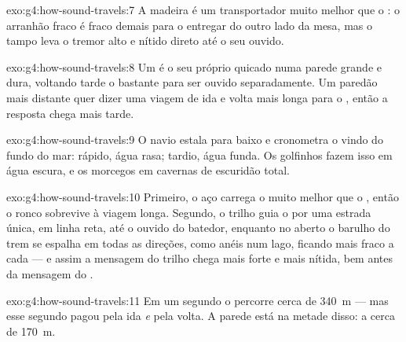 \begin{solution}{exo:g4:how-sound-travels:7}
A madeira é um transportador muito melhor que o : o arranhão fraco
é fraco demais para o  entregar do outro lado da mesa, mas o tampo
 leva o tremor alto e nítido direto até o seu ouvido.
\end{solution}

\begin{solution}{exo:g4:how-sound-travels:8}
Um  é o seu próprio  quicado numa parede grande e dura,
voltando tarde o bastante para ser ouvido separadamente. Um paredão
mais distante quer dizer uma viagem de ida e volta mais longa para o
, então a resposta chega mais tarde.
\end{solution}

\begin{solution}{exo:g4:how-sound-travels:9}
O navio estala para baixo e cronometra o  vindo do fundo do mar:
 rápido, água rasa;  tardio, água funda. Os golfinhos fazem
isso em água escura, e os morcegos em cavernas de escuridão total.
\end{solution}

\begin{solution}{exo:g4:how-sound-travels:10}
Primeiro, o aço carrega o  muito melhor que o , então o ronco
sobrevive à viagem longa. Segundo, o trilho guia o  por uma
estrada única, em linha reta, até o ouvido do batedor, enquanto no 
aberto o barulho do trem se espalha em todas as direções, como anéis
num lago, ficando mais fraco a cada  --- e assim a mensagem do
trilho chega mais forte e mais nítida, bem antes da mensagem do .
\end{solution}

\begin{solution}{exo:g4:how-sound-travels:11}
Em um segundo o  percorre cerca de \qty{340}{m} --- mas esse
segundo pagou pela ida \emph{e} pela volta. A parede está na metade
disso: a cerca de \qty{170}{m}.
\end{solution}
